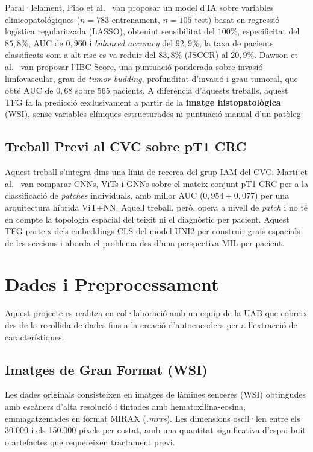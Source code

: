 \documentclass[10pt,a4paper,twocolumn,twoside]{article}
\begin{document}
Paral·lelament, Piao et al.~\cite{piao2023ai} van proposar un model
d'IA sobre variables clinicopatológiques ($n\!=\!783$ entrenament,
$n\!=\!105$ test) basat en regressió logística regularitzada (LASSO),
obtenint sensibilitat del $100\%$, especificitat del $85{,}8\%$, AUC de
$0{,}960$ i \textit{balanced accuracy} del $92{,}9\%$; la taxa de
pacients classificats com a alt risc es va reduir del $83{,}8\%$ (JSCCR)
al $20{,}9\%$. Dawson et al.~\cite{dawson2024budding} van proposar
l'IBC Score, una puntuació ponderada sobre invasió limfovascular, grau de
\textit{tumor budding}, profunditat d'invasió i grau tumoral,
que obté AUC de $0{,}68$ sobre $565$ pacients. A diferència d'aquests
treballs, aquest TFG fa la predicció exclusivament a partir de la
\textbf{imatge histopatològica} (WSI), sense variables clíniques
estructurades ni puntuació manual d'un patòleg.

\subsection{Treball Previ al CVC sobre pT1 CRC}

Aquest treball s'integra dins una línia de recerca del grup IAM del CVC. Martí et
al.~\cite{ddd.uab.cat:317556} van comparar CNNs, ViTs i GNNs sobre el mateix conjunt
pT1 CRC per a la classificació de \textit{patches} individuals, amb millor AUC
($0{,}954 \pm 0{,}077$) per una arquitectura híbrida ViT+NN. Aquell treball, però,
opera a nivell de \textit{patch} i no té en compte la topologia espacial del teixit
ni el diagnòstic per pacient. Aquest TFG parteix dels embeddings CLS del model UNI2
per construir grafs espacials de les seccions i aborda el problema des d'una
perspectiva MIL per pacient.

\section{Dades i Preprocessament}

Aquest projecte es realitza en col·laboració amb un equip de la UAB que cobreix des de la recollida de dades fins
a la creació d'autoencoders per a l'extracció de característiques.

\subsection{Imatges de Gran Format (WSI)}

Les dades originals consisteixen en imatges de làmines senceres (WSI) obtingudes amb escàners d'alta resolució i
tintades amb hematoxilina-eosina, emmagatzemades en format MIRAX (\textit{.mrxs}). Les dimensions oscil·len entre
els 30.000 i els 150.000 píxels per costat, amb una quantitat significativa d'espai buit o artefactes que
requereixen tractament previ.
\end{document}
